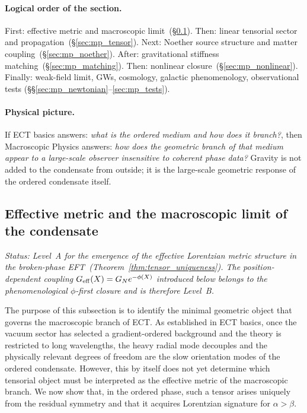 \paragraph{Logical order of the section.}
First: effective metric and macroscopic limit~(\S\ref{sec:mp_metric}).
Then: linear tensorial sector and propagation~(\S\ref{sec:mp_tensor}).
Next: Noether source structure and matter coupling~(\S\ref{sec:mp_noether}).
After: gravitational stiffness matching~(\S\ref{sec:mp_matching}).
Then: nonlinear closure~(\S\ref{sec:mp_nonlinear}).
Finally: weak-field limit, GWs, cosmology, galactic
phenomenology, observational tests
(\S\S\ref{sec:mp_newtonian}--\ref{sec:mp_tests}).

\paragraph{Physical picture.}
If ECT basics answers: \emph{what is the ordered medium and how
does it branch?}, then Macroscopic Physics answers:
\emph{how does the geometric branch of that medium appear to a
large-scale observer insensitive to coherent phase data?}
Gravity is not added to the condensate from outside; it is the
large-scale geometric response of the ordered condensate itself.

\subsection{Effective metric and the macroscopic limit
of the condensate}
\label{sec:mp_metric}

\textit{Status: Level~A for the emergence of the effective Lorentzian
metric structure in the broken-phase EFT~(Theorem~\ref{thm:tensor_uniqueness}).
The position-dependent coupling $G_{\rm eff}(X)=G_N e^{-\phi(X)}$
introduced below belongs to the phenomenological $\phi$-first closure
and is therefore Level~B.}

\medskip
The purpose of this subsection is to identify the minimal geometric
object that governs the macroscopic branch of ECT.
As established in ECT basics, once the vacuum sector has selected a
gradient-ordered background and the theory is restricted to long
wavelengths, the heavy radial mode decouples and the physically
relevant degrees of freedom are the slow orientation modes of the
ordered condensate.
However, this by itself does not yet determine which tensorial object
must be interpreted as the effective metric of the macroscopic branch.
We now show that, in the ordered phase, such a tensor arises uniquely
from the residual symmetry and that it acquires Lorentzian signature
for $\alpha>\beta$.

